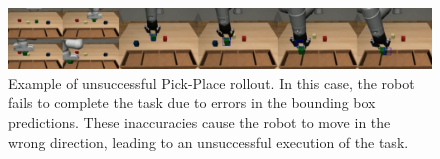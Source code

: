 \begin{figure}[b]
    \centering
    \includegraphics[width=1.0\textwidth]{figures/images/ch3/error_propagation.jpg}
    \caption{Example of unsuccessful Pick-Place rollout. In this case, the robot fails to complete the task due to errors in the bounding box predictions. These inaccuracies cause the robot to move in the wrong direction, leading to an unsuccessful execution of the task.}
    \label{fig:error_propagation}
\end{figure}
